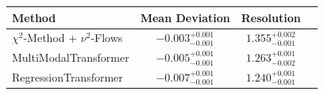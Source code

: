     \begin{tabular}{lccc}
        \toprule
        Method & Mean Deviation & Resolution \\
        \midrule
        $\chi^2$-Method + $\nu^2$-Flows & $-0.003_{-0.001}^{+0.001}$ & $1.355_{-0.001}^{+0.002}$ \\
        MultiModalTransformer & $-0.005_{-0.001}^{+0.001}$ & $1.263_{-0.002}^{+0.001}$ \\
        RegressionTransformer & $-0.007_{-0.001}^{+0.001}$ & $1.240_{-0.001}^{+0.001}$ \\
        \bottomrule
    \end{tabular}